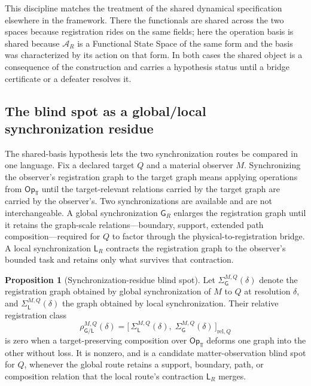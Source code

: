 \documentclass[10pt,twoside,a5paper]{article}
\theoremstyle{definition}
\newtheorem{claimprop}{Proposition}
\begin{document}
This discipline matches the treatment of the shared dynamical specification elsewhere
in the framework. There the functionals are shared across the two spaces because
registration rides on the same fields; here the operation basis is shared because
$\mathcal{A}_{R}$ is a Functional State Space of the same form and the basis was
characterized by its action on that form. In both cases the shared object is a
consequence of the construction and carries a hypothesis status until a bridge
certificate or a defeater resolves it.

\subsection{The blind spot as a global/local synchronization residue}
\label{subsec:blindspot-residue}

The shared-basis hypothesis lets the two synchronization routes be compared in one
language. Fix a declared target $Q$ and a material observer $M$. Synchronizing the
observer's registration graph to the target graph means applying operations from
$\mathsf{Op}_{\Top}$ until the target-relevant relations carried by the target graph
are carried by the observer's. Two synchronizations are available and are not
interchangeable. A global synchronization $\mathsf{G}_{R}$ enlarges the registration
graph until it retains the graph-scale relations---boundary, support, extended path
composition---required for $Q$ to factor through the physical-to-registration bridge.
A local synchronization $\mathsf{L}_{R}$ contracts the registration graph to the
observer's bounded task and retains only what survives that contraction.

\begin{claimprop}[Synchronization-residue blind spot]
\label{prop:sync-residue}
Let $\Sigma_{\mathsf{G}}^{M,Q}(\delta)$ denote the registration graph obtained by
global synchronization of $M$ to $Q$ at resolution $\delta$, and
$\Sigma_{\mathsf{L}}^{M,Q}(\delta)$ the graph obtained by local synchronization. Their
relative registration class
\begin{equation}
\rho_{\mathsf{G}/\mathsf{L}}^{M,Q}(\delta)
=
\bigl[\,
\Sigma_{\mathsf{L}}^{M,Q}(\delta),\;
\Sigma_{\mathsf{G}}^{M,Q}(\delta)
\,\bigr]_{\mathrm{rel},Q}
\label{eq:GL-sync-residue}
\end{equation}
is zero when a target-preserving composition over $\mathsf{Op}_{\Top}$ deforms one
graph into the other without loss. It is nonzero, and is a candidate
matter-observation blind spot for $Q$, whenever the global route retains a support,
boundary, path, or composition relation that the local route's contraction
$\mathsf{L}_{R}$ merges.
\end{claimprop}
\end{document}
